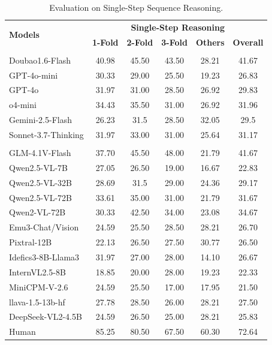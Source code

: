 \documentclass[letterpaper]{article} %
\begin{document}
\begin{table}[b]
\setlength{\tabcolsep}{1mm} 
\centering
\begin{tabular}{l|ccccc}
\toprule
\multirow{2}{*}{\textbf{Models}} & \multicolumn{5}{c}{\textbf{Single-Step Reasoning}} \\
 & \textbf{1-Fold} & \textbf{2-Fold} & \textbf{3-Fold} & \textbf{Others} & \textbf{Overall} \\
\midrule
\rowcolor{yellow!20}\multicolumn{6}{l}{\textbf{\textit{Proprietary}}} \\
Doubao1.6-Flash &\cellcolor{gray!30}40.98 &45.50 &43.50 &28.21 &\cellcolor{gray!30}41.67 \\
GPT-4o-mini &30.33 & 29.00& 25.50&19.23 &26.83 \\
GPT-4o & 31.97&31.00 &28.50 & 26.92&29.83 \\
o4-mini & 34.43&35.50 &31.00 & 26.92&31.96 \\
Gemini-2.5-Flash &26.23 &31.5 & 28.50&\cellcolor{gray!30}32.05 &29.5 \\
Sonnet-3.7-Thinking &31.97 &33.00 &31.00 & 25.64& 31.17\\
\midrule
\rowcolor{yellow!20}\multicolumn{6}{l}{\textbf{\textit{Open-source}}} \\
GLM-4.1V-Flash & 37.70& \cellcolor{gray!30}45.50&\cellcolor{gray!30}48.00 & 21.79&\cellcolor{gray!30}41.67 \\
Qwen2.5-VL-7B &27.05 &26.50 & 19.00&16.67& 22.83\\
Qwen2.5-VL-32B &28.69&31.5&29.00&24.36&29.17\\
Qwen2.5-VL-72B &33.61 &35.00 &31.00 &21.79 & 31.67\\
Qwen2-VL-72B &30.33 &42.50 & 34.00&23.08 &34.67 \\
Emu3-Chat/Vision &24.59&25.50&28.50&28.21&26.70\\
Pixtral-12B &22.13 & 26.50& 27.50& 30.77& 26.50\\
Idefics3-8B-Llama3 &31.97 &27.00 &28.00 & 14.10&26.67\\
InternVL2.5-8B & 18.85& 20.00& 28.00&19.23 &22.33\\
MiniCPM-V-2.6 & 24.59& 25.50&17.00 & 17.95& 21.50\\
llava-1.5-13b-hf &27.78&28.50&26.00&28.21&27.50\\
DeepSeek-VL2-4.5B &24.59&26.50&25.00&28.21&25.83\\
\midrule
Human&85.25&80.50&67.50&60.30&72.64\\
\bottomrule
\end{tabular}
\caption{Evaluation on Single-Step Sequence Reasoning.}
\label{tab:single_step_reasoning}
\end{table}
\end{document}

